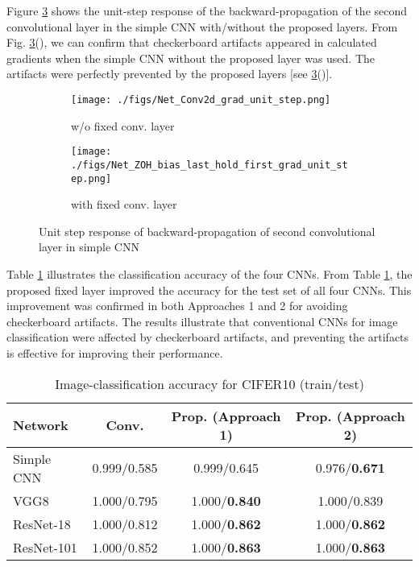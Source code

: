 \documentclass{article}
\begin{document}
  Figure \ref{fig:step_response} shows
  the unit-step response of the backward-propagation of
  the second convolutional layer in the simple CNN with/without the proposed layers.
  From Fig. \ref{fig:step_response}(),
  we can confirm that 
  checkerboard artifacts appeared in calculated gradients
  when the simple CNN without the proposed layer was used.
  The artifacts were perfectly prevented by the proposed layers
  [see \ref{fig:step_response}()].
\begin{figure}[!t]
  \centering
  \begin{subfigure}[t]{0.35\hsize}
    \centering
    \texttt{[image: ./figs/Net\_Conv2d\_grad\_unit\_step.png]}
    \caption{w/o fixed conv. layer \label{fig:step_response_conv}}
  \end{subfigure}
  \begin{subfigure}[t]{0.35\hsize}
    \centering
    \texttt{[image: ./figs/Net\_ZOH\_bias\_last\_hold\_first\_grad\_unit\_step.png]}
    \caption{with fixed conv. layer \label{fig:step_response_prop}}
  \end{subfigure}
  \vspace{-2ex}
  \caption{Unit step response of backward-propagation of
    second convolutional layer in simple CNN \label{fig:step_response}}
\end{figure}

  Table \ref{tab:classification_results} illustrates
  the classification accuracy of the four CNNs.
  From Table \ref{tab:classification_results},
  the proposed fixed layer improved the accuracy for the test set of all four CNNs.
  This improvement was confirmed in both Approaches 1 and 2
  for avoiding checkerboard artifacts.
  The results illustrate that conventional CNNs for image classification
  were affected by checkerboard artifacts,
  and preventing the artifacts is effective for improving their performance.
  \begin{table}[!t]
    \centering
    \footnotesize
    \caption{Image-classification accuracy for CIFER10 (train/test)}
    \begin{tabular}{l|ccc}\hline\hline
      Network & Conv. & Prop. (Approach 1) & Prop. (Approach 2) \\ \hline
      Simple CNN & 0.999/0.585 & 0.999/0.645 & 0.976/\textbf{0.671} \\
      VGG8 & 1.000/0.795 & 1.000/\textbf{0.840} & 1.000/0.839 \\
      ResNet-18 & 1.000/0.812 & 1.000/\textbf{0.862} & 1.000/\textbf{0.862} \\
      ResNet-101 & 1.000/0.852 & 1.000/\textbf{0.863} & 1.000/\textbf{0.863} \\
      \hline
    \end{tabular}
    \label{tab:classification_results}
  \end{table}
\end{document}
